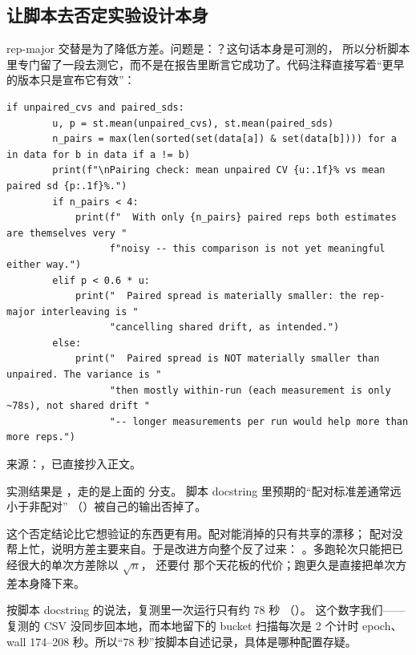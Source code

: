 \subsection{让脚本去否定实验设计本身}
\label{subsec:pairing-check}

rep-major 交替是为了降低方差。问题是：？这句话本身是可测的，
所以分析脚本里专门留了一段去测它，而不是在报告里断言它成功了。代码注释直接写着“更早的版本只是宣布它有效”：

\begin{lstlisting}[style=hlnum, firstnumber=127]
    if unpaired_cvs and paired_sds:
        u, p = st.mean(unpaired_cvs), st.mean(paired_sds)
        n_pairs = max(len(sorted(set(data[a]) & set(data[b]))) for a in data for b in data if a != b)
        print(f"\nPairing check: mean unpaired CV {u:.1f}% vs mean paired sd {p:.1f}%.")
        if n_pairs < 4:
            print(f"  With only {n_pairs} paired reps both estimates are themselves very "
                  f"noisy -- this comparison is not yet meaningful either way.")
        elif p < 0.6 * u:
            print("  Paired spread is materially smaller: the rep-major interleaving is "
                  "cancelling shared drift, as intended.")
        else:
            print("  Paired spread is NOT materially smaller than unpaired. The variance is "
                  "then mostly within-run (each measurement is only ~78s), not shared drift "
                  "-- longer measurements per run would help more than more reps.")
\end{lstlisting}
\noindent 来源：，已直接抄入正文。

实测结果是 ，走的是上面的  分支。
脚本 docstring 里预期的“配对标准差通常远小于非配对”
（）被自己的输出否掉了。

这个否定结论比它想验证的东西更有用。配对能消掉的只有共享的漂移；
配对没帮上忙，说明方差主要来自。于是改进方向整个反了过来：
。多跑轮次只能把已经很大的单次方差除以 $\sqrt{n}$，
还要付  那个天花板的代价；跑更久是直接把单次方差本身降下来。

按脚本 docstring 的说法，复测里一次运行只有约 78 秒
（）。
这个数字我们——复测的 CSV 没同步回本地，而本地留下的 bucket 扫描每次是
2 个计时 epoch、wall 174--208 秒。所以“78 秒”按脚本自述记录，具体是哪种配置存疑。

